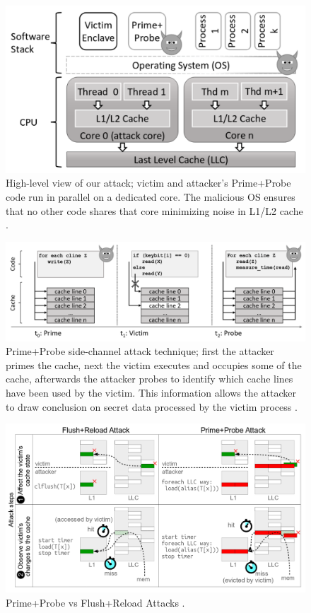 \begin{figure}
	\includegraphics[scale=0.2]{images/pp1}
	\caption{High-level view of our attack; victim and attacker’s Prime+Probe code run in parallel on a dedicated core. The malicious OS  ensures  that  no  other  code shares that core minimizing noise in L1/L2 cache \cite{brasser2017software}.}
	\label{fig:ppone}
\end{figure}
\begin{figure}
	\includegraphics[scale=0.2]{images/pp2}
	\caption{Prime+Probe side-channel attack technique; first the attacker primes the cache, next the victim executes and occupies some of the cache, afterwards the attacker probes to identify which cache lines have been used by the victim. This information allows the attacker to draw conclusion on secret data processed by the victim process \cite{brasser2017software}.}
	\label{fig:pptwo}
\end{figure}
\begin{figure}
	\includegraphics[scale=0.2]{images/ppfr}
	\caption{Prime+Probe vs Flush+Reload Attacks \cite{kayaalp2016high}.}
	\label{fig:ppfr}
\end{figure}

